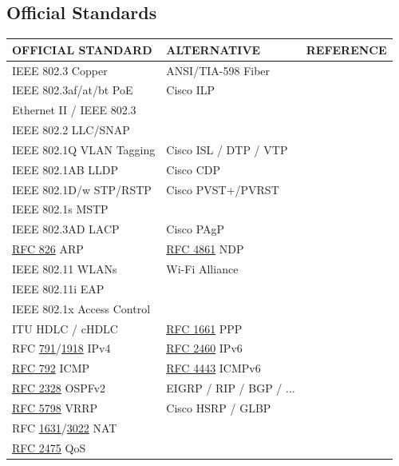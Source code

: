 \documentclass[12pt]{article}
\newcommand{\rfc}[1]{\href{https://datatracker.ietf.org/doc/html/rfc#1}{#1}}
\newcommand{\RFC}[1]{\href{https://datatracker.ietf.org/doc/html/rfc#1}{RFC #1}}
\begin{document}
	\subsection{Official Standards \label{subsec:STANDARDS}}
	\begin{table}[H]
	\centering
	\begin{tabular}{@{} l l r @{}}
	\textbf{OFFICIAL STANDARD}		& \textbf{ALTERNATIVE}		& \textbf{REFERENCE}\\\hline
	IEEE 802.3 Copper				& ANSI/TIA-598 Fiber		& \Cref{subsec:CABLING}\\
	IEEE 802.3af/at/bt PoE			& Cisco ILP				& \Cref{tab:POE}\\\hline
	Ethernet II / IEEE 802.3			&					& \Cref{subsec:802.3 ETHERNET}\\
	IEEE 802.2 LLC/SNAP			&					& \Cref{tab:802.2 LLC,tab:802.2 SNAP}\\
	IEEE 802.1Q VLAN Tagging		& Cisco ISL / DTP / VTP		& \Cref{subsec:VLAN TAGGING,subsec:CISCO VTP}\\
	IEEE 802.1AB LLDP			& Cisco CDP			& \Cref{subsec:CDP/802.1AB}\\
	IEEE 802.1D/w STP/RSTP			& Cisco PVST+/PVRST		& \Cref{subsec:802.1D/w}\\
	IEEE 802.1s MSTP				&					&\\
	IEEE 802.3AD LACP			& Cisco PAgP			&\\
	\RFC{826} ARP				& \RFC{4861} NDP		& \Cref{subsec:ARP,subsec:NDP}\\
	IEEE 802.11 WLANs			& Wi-Fi Alliance			& \Cref{subsec:802.11 WLANS}\\
	IEEE 802.11i EAP				&					& \Cref{tab:WIRELESS SECURITY}\\
	IEEE 802.1x Access Control		&					& \Cref{tab:WIRELESS SECURITY}\\
	ITU HDLC / cHDLC			& \RFC{1661} PPP			& \Cref{subsec:ITU HDLC,subsec:IETF PPP}\\\hline
	RFC \rfc{791}/\rfc{1918} IPv4		& \RFC{2460} IPv6		& \Cref{subsec:IPV4,subsec:IPV6}\\
	\RFC{792} ICMP				& \RFC{4443} ICMPv6		& \Cref{subsec:ICMP}\\
	\RFC{2328} OSPFv2			& EIGRP / RIP / BGP / ...		& \Cref{subsec:OSPF}\\
	\RFC{5798} VRRP				& Cisco HSRP / GLBP		&\\
	RFC \rfc{1631}/\rfc{3022} NAT		&					&\\
	\RFC{2475} QoS				&					& \Cref{sec:QOS}\\

\end{tabular}
\end{table}
\end{document}
